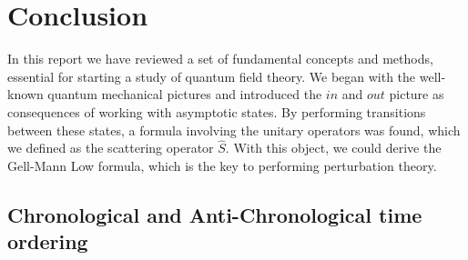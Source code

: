 \documentclass[
12pt, %
english, %
singlespacing, %
headsepline, %
]{MastersDoctoralThesis} %
\begin{document}
\chapter{Conclusion}
In this report we have reviewed a set of fundamental concepts and methods, essential for starting a study of quantum field theory. We began with the well-known quantum mechanical pictures and introduced the $ in $ and $ out $ picture as consequences of working with asymptotic states. By performing transitions between these states, a formula involving the unitary operators was found, which we defined as the scattering operator $ \hat{S} $. With this object, we could derive the Gell-Mann Low formula, which is the key to performing perturbation theory. 
\newpage
\begin{subappendices}
\section{Chronological and Anti-Chronological time ordering}\label{chronological_time}


\end{subappendices}
\end{document}
